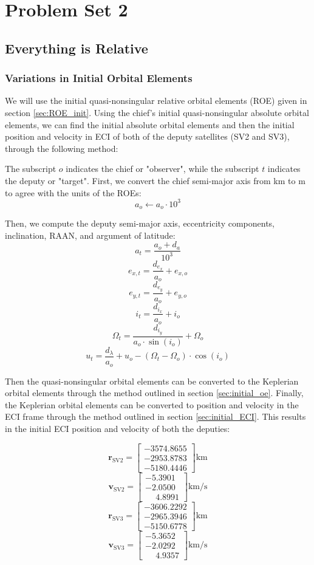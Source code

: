 \section{Problem Set 2}
\subsection{Everything is Relative}

\subsubsection{Variations in Initial Orbital Elements} \label{sec:rel_init_oe}
We will use the initial quasi-nonsingular relative orbital elements (ROE) given in section \ref{sec:ROE_init}. Using the chief's initial quasi-nonsingular absolute orbital elements, we can find the initial absolute orbital elements and then the initial position and velocity in ECI of both of the deputy satellites (SV2 and SV3), through the following method: 

The subscript $o$ indicates the chief or "observer", while the subscript $t$ indicates the deputy or "target". First, we convert the chief semi-major axis from km to m to agree with the units of the ROEs:
\[
a_o \leftarrow a_o \cdot 10^3
\]

Then, we compute the deputy semi-major axis, eccentricity components, inclination, RAAN, and argument of latitude:
\[
a_t = \frac{a_o + d_a}{10^3}
\]
\[
e_{x,t} = \frac{d_{e_x}}{a_o} + e_{x,o}
\]
\[
e_{y,t} = \frac{d_{e_y}}{a_o} + e_{y,o}
\]
\[
i_t = \frac{d_{i_x}}{a_o}  + i_o
\]
\[
\Omega_t = \frac{d_{i_y}}{a_o \cdot \sin(i_o)}  + \Omega_o
\]
\[
u_t =  \frac{d_\lambda}{a_o}+ u_o - (\Omega_t - \Omega_o) \cdot \cos(i_o)
\]

Then the quasi-nonsingular orbital elements can be converted to the Keplerian orbital elements through the method outlined in section \ref{sec:initial_oe}. Finally, the Keplerian orbital elements can be converted to position and velocity in the ECI frame through the method outlined in section \ref{sec:initial_ECI}. This results in the initial ECI position and velocity of both the deputies: 

\[
\mathbf{r}_{\text{SV2}} =
\begin{bmatrix}
-3574.8655 \\
-2953.8783 \\
-5180.4446
\end{bmatrix} \text{km}
\]
\[
\mathbf{v}_{\text{SV2}} =
\begin{bmatrix}
-5.3901 \\
-2.0500 \\
\phantom{-}4.8991
\end{bmatrix} \text{km/s}
\]
\[
\mathbf{r}_{\text{SV3}} =
\begin{bmatrix}
-3606.2292 \\
-2965.3946 \\
-5150.6778
\end{bmatrix} \text{km}
\]
\[
\mathbf{v}_{\text{SV3}} =
\begin{bmatrix}
-5.3652 \\
-2.0292 \\
\phantom{-}4.9357
\end{bmatrix} \text{km/s}
\]


